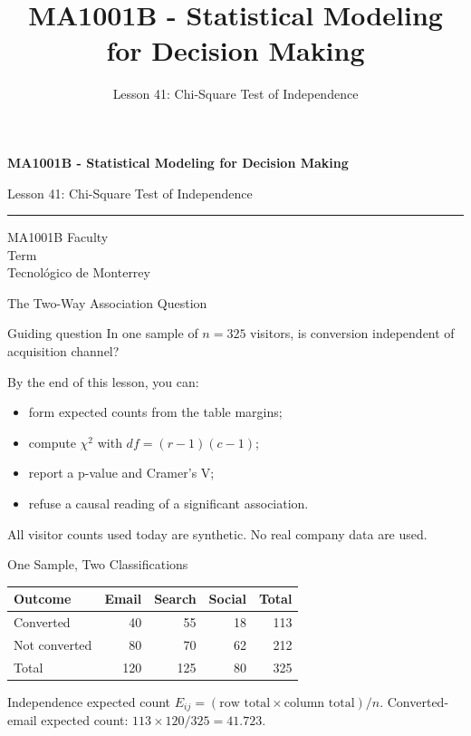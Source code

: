 \documentclass[aspectratio=169,10pt,english]{beamer}
\title{MA1001B - Statistical Modeling for Decision Making}
\subtitle{Lesson 41: Chi-Square Test of Independence}
\author{}
\institute{Tecnol\'ogico de Monterrey}
\date{}
\begin{document}
\begin{frame}[plain]
  \vspace{1.2cm}
  {\Large\bfseries MA1001B - Statistical Modeling for Decision Making\par}
  \vspace{0.7cm}
  {\large Lesson 41: Chi-Square Test of Independence\par}
  \vspace{0.7cm}
  {\color{TecRojo}\rule{\textwidth}{1.2pt}}
  \vspace{0.8cm}

  MA1001B Faculty\\[0.3cm]
  Term\\[0.3cm]
  Tecnol\'ogico de Monterrey
\end{frame}

\begin{frame}{The Two-Way Association Question}
  \begin{alertblock}{Guiding question}
    In one sample of $n=325$ visitors, is conversion independent of
    acquisition channel?
  \end{alertblock}

  \vspace{0.6em}
  By the end of this lesson, you can:
  \begin{itemize}
    \item form expected counts from the table margins;
    \item compute $\chi^2$ with $df=(r-1)(c-1)$;
    \item report a p-value and Cramer's V;
    \item refuse a causal reading of a significant association.
  \end{itemize}

  \vfill
  \scriptsize All visitor counts used today are synthetic. No real company data are used.
\end{frame}

\begin{frame}{One Sample, Two Classifications}
  \small
  \begin{center}
    \begin{tabular}{lrrrr}
      \toprule
      \textbf{Outcome} & \textbf{Email} & \textbf{Search} & \textbf{Social} & \textbf{Total} \\
      \midrule
      Converted & 40 & 55 & 18 & 113 \\
      Not converted & 80 & 70 & 62 & 212 \\
      \midrule
      Total & 120 & 125 & 80 & 325 \\
      \bottomrule
    \end{tabular}
  \end{center}

  \vspace{0.4em}
  \begin{exampleblock}{Independence expected count}
    $E_{ij}=(\text{row total}\times\text{column total})/n$. Converted-email
    expected count: $113\times120/325=41.723$.
  \end{exampleblock}
\end{frame}
\end{document}
